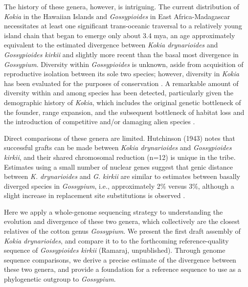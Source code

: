 \documentclass[10pt,letterpaper]{article}
\begin{document}
The history of these genera, however, is intriguing. The current distribution of
\textit{Kokia} in the Hawaiian Islands and \textit{Gossypioides} in East Africa-Madagascar
necessitates at least one significant trans-oceanic traversal to a relatively
young island chain that began to emerge only about 3.4 mya, an age approximately
equivalent to the estimated divergence between \textit{Kokia drynarioides} and
\textit{Gossypioides kirkii} \cite{Seelanan1997} and slightly more recent than the basal
most divergence in \textit{Gossypium}. Diversity within \textit{Gossypioides} is unknown, aside
from acquisition of reproductive isolation between its sole two species;
however, diversity in \textit{Kokia} has been evaluated for the purposes of conservation
\cite{Sherwood2014}. A remarkable amount of diversity within and among species
has been detected, particularly given the demographic history of \textit{Kokia}, which
includes the original genetic bottleneck of the founder, range expansion, and
the subsequent bottleneck of habitat loss and the introduction of competitive
and/or damaging alien species \cite{Sherwood2014}.

Direct comparisons of these genera are limited. Hutchinson (1943) notes that
successful grafts can be made between\textit{ Kokia drynarioides} and \textit{Gossypioides
kirkii}, and their shared chromosomal reduction (n=12) is unique in the tribe.
Estimates using a small number of nuclear genes suggest that genic distance
between \textit{K. drynarioides} and\textit{ G. kirkii} are similar to estimates between basally
diverged species in \textit{Gossypium}, i.e., approximately 2\% versus 3\%, although a
slight increase in replacement site substitutions is observed \cite{Cronn2002}.                                

Here we apply a whole-genome sequencing strategy to understanding the evolution
and divergence of these two genera, which collectively are the closest relatives
of the cotton genus \textit{Gossypium}. We present the first draft assembly of \textit{Kokia
drynarioides}, and compare it to to the forthcoming reference-quality sequence of \textit{Gossypioides kirkii} (Ramaraj, unpublished). Through genome sequence comparisons, we derive a precise estimate of
the divergence between these two genera, and provide a foundation for a
reference sequence to use as a phylogenetic outgroup to \textit{Gossypium}.



\end{document}
